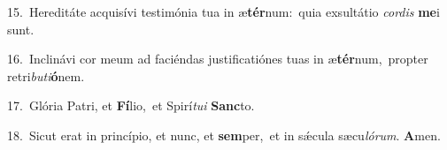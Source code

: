 {\numbfont\textcolor{\numbcolor}{15.}}~Hereditáte acquisívi testimónia tua in æ\-\textbf{tér}\-num:~\star quia exsultátio \textit{cor}\-\textit{dis} \textbf{me}\-i sunt.\par
{\numbfont\textcolor{\numbcolor}{16.}}~Inclinávi cor meum ad faciéndas justificatiónes tuas in æ\-\textbf{tér}\-num,~\star propter retri\-\textit{bu}\-\textit{ti}\textbf{ó}nem.\par
{\numbfont\textcolor{\numbcolor}{17.}}~Glória Patri, et \textbf{Fí}\-lio,~\star et Spirí\-\textit{tu}\-\textit{i} \textbf{Sanc}\-to.\par
{\numbfont\textcolor{\numbcolor}{18.}}~Sicut erat in princípio, et nunc, et \textbf{sem}\-per,~\star et in sǽcula sæcu\-\textit{ló}\-\textit{rum}. \textbf{A}\-men.\par
